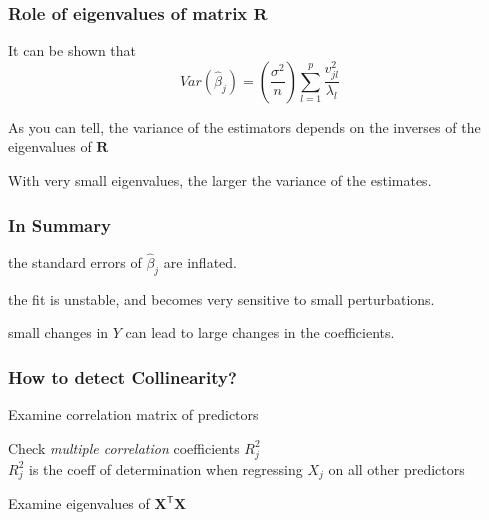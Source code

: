 \documentclass[12pt]{beamer}\usepackage[]{graphicx}\usepackage[]{color}
\begin{document}

\begin{frame}
\frametitle{Role of eigenvalues of matrix $\mathbf{R}$}

It can be shown that 
$$
Var(\hat{\beta}_j) = \left ( \frac{\sigma^2}{n} \right )  \sum_{l=1}^{p} \frac{v^{2}_{jl}}{\lambda_l}
$$

As you can tell, the variance of the estimators depends on the inverses of the
eigenvalues of $\mathbf{R}$

\bigskip
With very small eigenvalues, the larger the variance of the estimates.

\end{frame}


\begin{frame}
\frametitle{In Summary}

\bbi
  \item the standard errors of $\hat{\beta}_j$ are inflated.
  \item the fit is unstable, and becomes very sensitive to small perturbations.
  \item small changes in $Y$ can lead to large changes in the coefficients.
\ei
\eb

\end{frame}


\begin{frame}
\begin{center}
\Huge{}
\end{center}
\end{frame}


\begin{frame}
\frametitle{How to detect Collinearity?}

\bbi
  \item Examine correlation matrix of predictors
  \item Check \textit{multiple correlation} coefficients $R_{j}^{2}$ \\
  {\small {\lolit $R_{j}^{2}$ is the coeff of determination when regressing $X_j$ on all other predictors}}
  \item Examine eigenvalues of $\mathbf{X^\mathsf{T} X}$
\ei

\end{frame}
\end{document}
